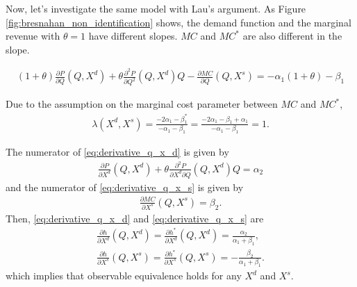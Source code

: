 \documentclass[11pt, a4paper]{article}
\theoremstyle{remark}
\begin{document}
Now, let's investigate the same model with Lau's argument.
As Figure \ref{fig:bresnahan_non_identification} shows, the demand function and the marginal revenue with $\theta = 1$ have different slopes.
$MC$ and $MC^{*}$ are also different in the slope.

\begin{align}
    (1+\theta) \frac{\partial P}{\partial Q}(Q, X^d) + \theta \frac{\partial^2 P}{\partial Q^2}(Q, X^d) Q  - \frac{\partial MC}{\partial Q}(Q, X^s) = -\alpha_1(1 + \theta)   - \beta_1
\end{align}

Due to the assumption on the marginal cost parameter between $MC$ and $MC^{*}$,
\begin{align}
    \lambda(X^{d}, X^{s}) = \frac{-2\alpha_1  - \beta_1^{*}}{-\alpha_1  - \beta_1} =   \frac{-2\alpha_1  -\beta_1 + \alpha_1}{-\alpha_1  - \beta_1} = 1.
\end{align}

The numerator of \eqref{eq:derivative_q_x_d} is given by
\begin{align}
    \frac{\partial P}{\partial X^{d}}(Q, X^{d}) + \theta\frac{\partial^2 P}{\partial X^{d}\partial Q}(Q, X^{d})Q   = \alpha_2
\end{align}
and the numerator of \eqref{eq:derivative_q_x_s} is given by
\begin{align}
    \frac{\partial MC}{\partial X^{s}}(Q, X^{s}) = \beta_2.
\end{align}
Then, \eqref{eq:derivative_q_x_d} and \eqref{eq:derivative_q_x_s} are 
\begin{align}
    \frac{\partial h}{\partial X^{d}}(Q, X^{d}) = \frac{\partial h^{*}}{\partial X^{d}}(Q, X^{d})  = \frac{\alpha_2}{\alpha_1 + \beta_1},\\
    \frac{\partial h}{\partial X^{s}}(Q, X^{s}) = \frac{\partial h^{*}}{\partial X^{s}}(Q, X^{s})  =-\frac{\beta_2}{\alpha_1 + \beta_1}.
\end{align}
which implies that observable equivalence holds for any $X^d$ and $X^s$.
\end{document}
